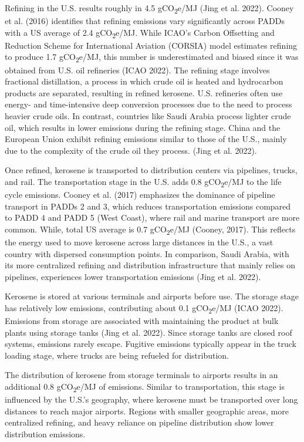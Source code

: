 \documentclass[12pt]{article}
\begin{document}
Refining in the U.S. results roughly in 4.5 gCO\textsubscript{2}e/MJ (Jing et al. 2022). Cooney et al. (2016) identifies that refining emissions vary significantly across PADDs with a US average of 2.4 gCO\textsubscript{2}e/MJ. While ICAO’s Carbon Offsetting and Reduction Scheme for International Aviation (CORSIA) model estimates refining to produce 1.7 gCO\textsubscript{2}e/MJ, this number is underestimated and biased since it was obtained from U.S. oil refineries (ICAO 2022). The refining stage involves fractional distillation, a process in which crude oil is heated and hydrocarbon products are separated, resulting in refined kerosene. U.S. refineries often use energy- and time-intensive deep conversion processes due to the need to process heavier crude oils. In contrast, countries like Saudi Arabia process lighter crude oil, which results in lower emissions during the refining stage. China and the European Union exhibit refining emissions similar to those of the U.S., mainly due to the complexity of the crude oil they process. (Jing et al. 2022).

Once refined, kerosene is transported to distribution centers via pipelines, trucks, and rail. The transportation stage in the U.S. adds 0.8 gCO\textsubscript{2}e/MJ to the life cycle emissions. Cooney et al. (2017) emphasizes the dominance of pipeline transport in PADDs 2 and 3, which reduces transportation emissions compared to PADD 4 and PADD 5 (West Coast), where rail and marine transport are more common. While, total US average is 0.7 gCO\textsubscript{2}e/MJ (Cooney, 2017). This reflects the energy used to move kerosene across large distances in the U.S., a vast country with dispersed consumption points. In comparison, Saudi Arabia, with its more centralized refining and distribution infrastructure that mainly relies on pipelines, experiences lower transportation emissions (Jing et al. 2022).

Kerosene is stored at various terminals and airports before use. The storage stage has relatively low emissions, contributing about 0.1 gCO\textsubscript{2}e/MJ (ICAO 2022). Emissions from storage are associated with maintaining the product at bulk plants using storage tanks (Jing et al. 2022). Since storage tanks are closed roof systems, emissions rarely escape. Fugitive emissions typically appear in the truck loading stage, where trucks are being refueled for distribution.

The distribution of kerosene from storage terminals to airports results in an additional 0.8 gCO\textsubscript{2}e/MJ of emissions. Similar to transportation, this stage is influenced by the U.S.'s geography, where kerosene must be transported over long distances to reach major airports. Regions with smaller geographic areas, more centralized refining, and heavy reliance on pipeline distribution show lower distribution emissions.
\end{document}

